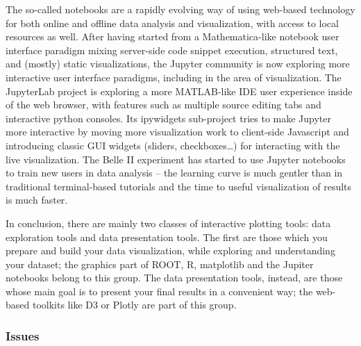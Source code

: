 \documentclass[12pt,a4paper]{article}
\begin{document}
The so-called notebooks are a rapidly evolving way of using web-based technology for both online and offline data analysis and
visualization, with access to local resources as well. After having started from a Mathematica-like notebook user interface
paradigm mixing server-side code snippet execution, structured text, and (mostly) static visualizations, the Jupyter community
is now exploring more interactive user interface paradigms, including in the area of visualization. The JupyterLab project is
exploring a more MATLAB-like IDE user experience inside of the web browser, with features such as multiple source editing tabs
and interactive python consoles. Its ipywidgets sub-project tries to make Jupyter more interactive by moving more visualization
work to client-side Javascript and introducing classic GUI widgets (sliders, checkboxes…) for interacting with the live visualization.
The Belle II experiment has started to use Jupyter notebooks to train new users in data analysis – the learning curve is much gentler than in
traditional terminal-based tutorials and the time to useful visualization of results is much faster.

In conclusion, there are mainly two classes of interactive plotting tools: data exploration tools and data presentation tools.
The first are those which you prepare and build your data visualization, while exploring and understanding your dataset;
the graphics part of ROOT, R, matplotlib and the Jupiter notebooks belong to this group. The data presentation tools, instead,
are those whose main goal is to present your final results in a convenient way; the web-based toolkits like D3 or Plotly
are part of this group.

\hypertarget{stats-issues}{%
\subsubsection{Issues}\label{stats-issues}}
\end{document}
